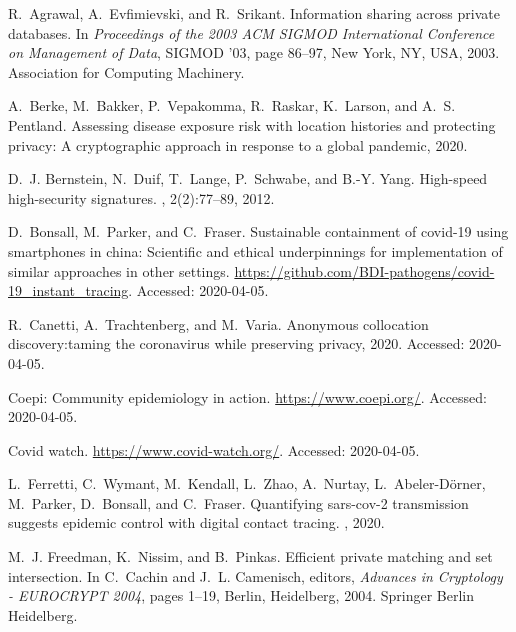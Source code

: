 \documentclass{article}
\begin{document}
% 
% 

\begin{thebibliography}{10}

R.~Agrawal, A.~Evfimievski, and R.~Srikant.
\newblock Information sharing across private databases.
\newblock In {\em Proceedings of the 2003 ACM SIGMOD International Conference
  on Management of Data}, SIGMOD ’03, page 86–97, New York, NY, USA, 2003.
  Association for Computing Machinery.

A.~Berke, M.~Bakker, P.~Vepakomma, R.~Raskar, K.~Larson, and A.~S. Pentland.
\newblock Assessing disease exposure risk with location histories and
  protecting privacy: A cryptographic approach in response to a global
  pandemic, 2020.

D.~J. Bernstein, N.~Duif, T.~Lange, P.~Schwabe, and B.-Y. Yang.
\newblock High-speed high-security signatures.
, 2(2):77--89, 2012.

D.~Bonsall, M.~Parker, and C.~Fraser.
\newblock Sustainable containment of covid-19 using smartphones in china:
  Scientific and ethical underpinnings for implementation of similar approaches
  in other settings.
\newblock \url{https://github.com/BDI-pathogens/covid-19_instant_tracing}.
\newblock Accessed: 2020-04-05.

R.~Canetti, A.~Trachtenberg, and M.~Varia.
\newblock Anonymous collocation discovery:taming the coronavirus while
  preserving privacy, 2020.
\newblock Accessed: 2020-04-05.

Coepi: Community epidemiology in action.
\newblock \url{https://www.coepi.org/}.
\newblock Accessed: 2020-04-05.

Covid watch.
\newblock \url{https://www.covid-watch.org/}.
\newblock Accessed: 2020-04-05.

L.~Ferretti, C.~Wymant, M.~Kendall, L.~Zhao, A.~Nurtay, L.~Abeler-D{\"o}rner,
  M.~Parker, D.~Bonsall, and C.~Fraser.
\newblock Quantifying sars-cov-2 transmission suggests epidemic control with
  digital contact tracing.
, 2020.

M.~J. Freedman, K.~Nissim, and B.~Pinkas.
\newblock Efficient private matching and set intersection.
\newblock In C.~Cachin and J.~L. Camenisch, editors, {\em Advances in
  Cryptology - EUROCRYPT 2004}, pages 1--19, Berlin, Heidelberg, 2004. Springer
  Berlin Heidelberg.


\end{thebibliography}
\end{document}
